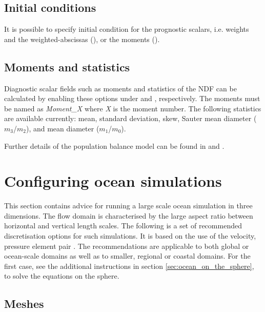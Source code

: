 \subsection{Initial conditions}
It is possible to specify initial condition for the prognostic scalars, i.e. weights and the weighted-abscissas (), or the moments ().

\subsection{Moments and statistics}
Diagnostic scalar fields such as moments and statistics of the NDF can be calculated by enabling these options under  and , respectively. The moments must be named as \emph{Moment\_X} where \emph{X} is the moment number. The following statistics are available currently: mean, standard deviation, skew, Sauter mean diameter ($m_3$/$m_2$), and mean diameter ($m_1$/$m_0$).

Further details of the population balance model can be found in \citet{bhutani2016polydispersed} and \citet{bhutani2016}.

\section{Configuring ocean simulations}
\label{sec:large-scale-ocean}

This section contains advice for running a large scale ocean simulation in
three dimensions. The flow domain is characterised by the large aspect ratio
between horizontal and vertical length scales. The following is a set of
recommended discretisation options for such simulations. It is based on the use
of the \PoDGPt velocity, pressure element pair \citep{cotter2009}. The
recommendations are applicable to both global or ocean-scale domains as well as
to smaller, regional or coastal domains. For the first case, see the additional
instructions in section \ref{sec:ocean_on_the_sphere}, to solve the equations
on the sphere.

\subsection{Meshes}

